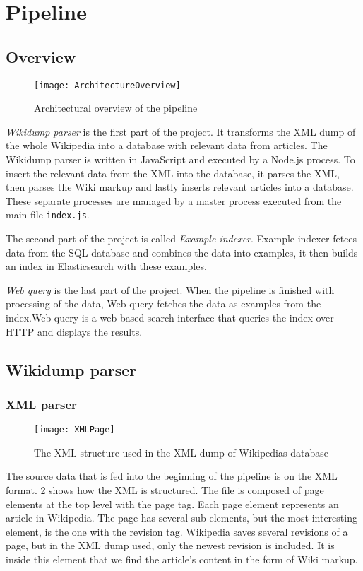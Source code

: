 \section{Pipeline}

\subsection{Overview}

\begin{figure}[h]
\caption{Architectural overview of the pipeline}
\texttt{[image: ArchitectureOverview]}
\label{fig:pipeline_arch}
\end{figure}


\textit{Wikidump parser} is the first part of the project. It transforms the XML dump of the whole Wikipedia into a database with relevant data from articles. The Wikidump parser is written in JavaScript and executed by a Node.js process. To insert the relevant data from the XML into the database, it parses the XML, then parses the Wiki markup and lastly inserts relevant articles into a database. These separate processes are managed by a master process executed from the main file \texttt{index.js}.

The second part of the project is called \textit{Example indexer}. Example indexer fetces data from the SQL database and combines the data into examples, it then builds an index in Elasticsearch with these examples.

\textit{Web query} is the last part of the project. When the pipeline is finished with processing of the data, Web query fetches the data as examples from the index.Web query is a web based search interface that queries the index over HTTP and displays the results. 


\subsection{Wikidump parser}


\subsubsection{XML parser}
\begin{figure}[h]
\caption{The XML structure used in the XML dump of Wikipedias database}
\texttt{[image: XMLPage]}
\label{fig:xml}
\end{figure}

The source data that is fed into the beginning of the pipeline is on the XML format. \ref{fig:xml} shows how the XML is structured. The file is composed of page elements at the top level with the page tag. Each page element represents an article in Wikipedia. The page has several sub elements, but the most interesting element, is the one with the revision tag. Wikipedia saves several revisions of a page, but in the XML dump used, only the newest revision is included. It is inside this element that we find the article's content in the form of Wiki markup.



